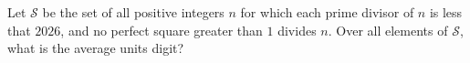 Let $\mathcal{S}$ be the set of all positive integers $n$ for which each prime divisor of $n$ is less that $2026$, and no perfect square greater than $1$ divides $n$. Over all elements of $\mathcal{S}$, what is the average units digit?
